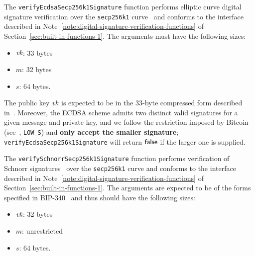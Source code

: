 \label{note:verify-ecdsa-secp256k1-signature}
The \texttt{verifyEcdsaSecp256k1Signature} function performs elliptic curve
digital signature verification \cite{ANSI-X9.62, ANSI-x9.142,
  Johnson-Menezes-Vanstone-ECDSA} over the \texttt{secp256k1}
curve~\cite[\S2.4.1]{SECP256} and conforms to the interface described in
Note~\ref{note:digital-signature-verification-functions} of
Section~\ref{sec:built-in-functions-1}.  The arguments must have the
following sizes:
\begin{itemize}
\item $\textit{vk}$: 33 bytes
\item $m$: 32 bytes
\item $s$: 64 bytes.
\end{itemize}
The public key $\textit{vk}$ is expected to be in the 33-byte compressed form described
in~\cite{Bitcoin-ECDSA}.  Moreover, the ECDSA scheme admits two distinct valid
signatures for a given message and private key, and  we follow the restriction
imposed by Bitcoin (see~\cite{BIP-146},
\texttt{LOW\_S}) and \textbf{only accept the smaller signature};
\texttt{verifyEcdsa\-Secp\-256k1Signature} will return $\mathsf{false}$ if the larger
one is supplied.

%

\label{note:verify-schnorr-secp256k1-signature}
The \texttt{verifySchnorrSecp256k1Signature} function performs verification of
Schnorr signatures~\cite{Schnorr89, BIP-340} over the \texttt{secp256k1} curve
and conforms to the interface described in
Note~\ref{note:digital-signature-verification-functions} of
Section~\ref{sec:built-in-functions-1}.  The arguments are expected to be
of the forms specified in BIP-340~\cite{BIP-340} and thus should have the
following sizes:
\begin{itemize}
\item $\textit{vk}$: 32 bytes
\item $m$: unrestricted
\item $s$: 64 bytes.
\end{itemize}
